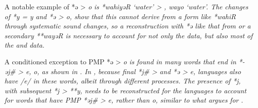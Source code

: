 A notable example of *ə > \it{o} is *wahiyəR ‘water’ > ,  \it{wayo} ‘water’.
The changes of *y = \it{y}
and *ə > \it{o},
show that this cannot derive from a form like *wahiR through
systematic sound changes, so a reconstruction with
*ə like that from \citet{Wolff2010}
or a secondary **wayəR is necessary to account for not only the
 data, but also most of the  and  data.

\clearpage
A conditioned exception to PMP *ə > \it{o} is found in many words
that end in *-əj{\#} > \it{e,
o}, as shown in .
In , because final *j{\#} > {\0}
and *ə > \it{e},
 languages also have /e/ in these words,
albeit through different processes.
The presence of *j,
with subsequent *j > **y,
needs to be reconstructed for the  languages to
account for words that have PMP *əj{\#} > \it{e},
rather than \it{o}, similar to what \citet[76--77]{Mead2003b}
argues for .

